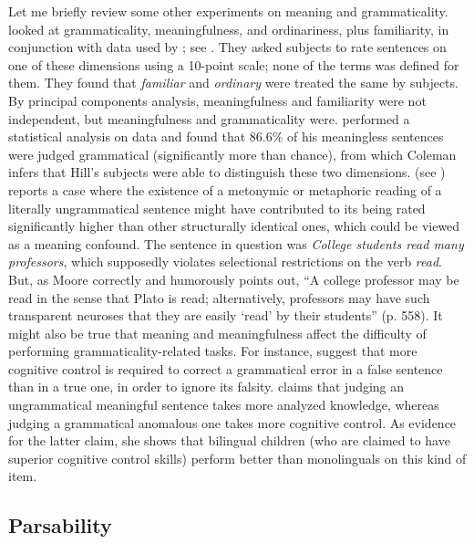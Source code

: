 Let me  briefly review some other experiments on meaning and grammaticality. \citet{DanksEtAl1970} looked at grammaticality, meaningfulness, and ordinariness, plus familiarity, in conjunction with data used by \citet{Coleman1965};
see . They asked subjects to rate sentences on one of these dimensions using a 10-point scale; none of the terms was defined for them. They found that \textit{familiar} and \textit{ordinary} were treated the same by subjects. By principal
components analysis, meaningfulness and familiarity were not independent, but meaningfulness and grammaticality were. \citet{Coleman1965} performed a statistical analysis on  data and found that 86.6\% of his meaningless sentences were judged grammatical (significantly more than chance), from which Coleman infers that Hill's subjects were able to distinguish these two dimensions. \citet{Moore1972} (see ) reports a case where the existence of a metonymic or metaphoric reading of a literally ungrammatical sentence might have contributed to its being rated significantly higher than other structurally identical ones, which could be viewed as a meaning confound. The sentence in question was \textit{College students read many professors}, which supposedly violates selectional restrictions on the verb \textit{read}. But, as Moore correctly and humorously points out, ``A college professor may be read in the sense that Plato is read; alternatively, professors may have such transparent neuroses that they are easily `read' by their students'' (p. 558). It might also be true that meaning and meaningfulness affect the difficulty of performing grammaticality-related tasks. For instance, \citet{RyanEtAl1984} suggest that more cognitive control is required to correct a grammatical error in a false sentence than in a true one, in order to ignore its falsity. \citet{Bialystok1986} claims that judging an ungrammatical meaningful sentence takes more analyzed knowledge, whereas judging a grammatical anomalous one takes more cognitive control. As evidence for the latter claim, she shows that bilingual children (who are claimed to have superior cognitive control skills) perform better than monolinguals on this kind of item.

\subsection{Parsability}\label{sec:5.3.3} 


